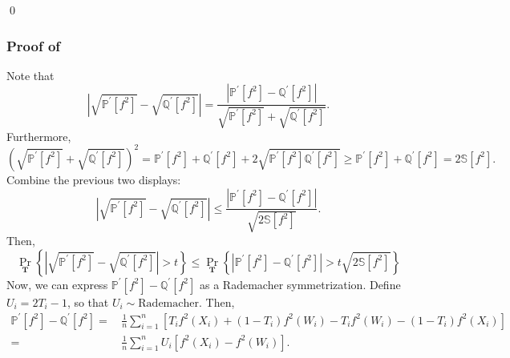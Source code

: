 \qed

\subsubsection{Proof of
\texorpdfstring{}{Lemma
\ref{lem--sqrt-ep-2nd-moment-ratio-symm-single}}}
\label{sec--prf--lem--sqrt-ep-2nd-moment-ratio-symm-single}

Note that
\begin{equation*}
  \left| \sqrt{\mathbb{P}^{\prime} \left[ f^{2} \right]} -
  \sqrt{\mathbb{Q}^{\prime} \left[ f^{2} \right]} \right| = \frac{\left|
  \mathbb{P}^{\prime} \left[ f^{2} \right] - \mathbb{Q}^{\prime} \left[ f^{2}
  \right] \right|}{\sqrt{\mathbb{P}^{\prime} \left[ f^{2} \right]} +
  \sqrt{\mathbb{Q}^{\prime} \left[ f^{2} \right]}}.
\end{equation*}
Furthermore,
\begin{equation*}
  \left( \sqrt{\mathbb{P}^{\prime} \left[ f^{2} \right]} +
  \sqrt{\mathbb{Q}^{\prime} \left[ f^{2} \right]} \right)^{2} =
  \mathbb{P}^{\prime} \left[ f^{2} \right] + \mathbb{Q}^{\prime} \left[
  f^{2} \right] + 2 \sqrt{\mathbb{P}^{\prime} \left[ f^{2} \right]
  \mathbb{Q}^{\prime} \left[ f^{2} \right]} \geq \mathbb{P}^{\prime} \left[
  f^{2} \right] + \mathbb{Q}^{\prime} \left[ f^{2} \right] = 2
  \mathbb{S} \left[ f^{2} \right].
\end{equation*}
Combine the previous two displays:
\begin{equation*}
  \left| \sqrt{\mathbb{P}^{\prime} \left[ f^{2} \right]} -
  \sqrt{\mathbb{Q}^{\prime} \left[ f^{2} \right]} \right| \leq \frac{\left|
  \mathbb{P}^{\prime} \left[ f^{2} \right] - \mathbb{Q}^{\prime} \left[ f^{2}
  \right] \right|}{\sqrt{2 \mathbb{S} \left[ f^{2} \right]}}.
\end{equation*}
Then,
\begin{equation*}
  \Pr_{\mathbf{T}} \left\{ \left| \sqrt{\mathbb{P}^{\prime} \left[ f^{2}
  \right]} - \sqrt{\mathbb{Q}^{\prime} \left[ f^{2} \right]} \right| > t
  \right\} \leq \Pr_{\mathbf{T}} \left\{ \left| \mathbb{P}^{\prime} \left[ f^{2}
  \right] - \mathbb{Q}^{\prime} \left[ f^{2} \right] \right| > t \sqrt{2
  \mathbb{S} \left[ f^{2} \right]} \right\}
\end{equation*}
Now, we can express \(\mathbb{P}^{\prime} \left[ f^{2} \right] -
\mathbb{Q}^{\prime} \left[ f^{2} \right]\) as a Rademacher symmetrization.
Define \(U_{i} = 2 T_{i} - 1\), so that \(U_{i} \sim \mathrm{Rademacher}\).
Then,
\begin{align*}
  \mathbb{P}^{\prime} \left[ f^{2} \right] - \mathbb{Q}^{\prime} \left[ f^{2}
  \right] =
  & \, \frac{1}{n} \sum_{i = 1}^{n} \left[ T_{i} f^{2} \left( X_{i} \right)
  + \left( 1 - T_{i} \right) f^{2} \left( W_{i} \right) - T_{i} f^{2} \left(
  W_{i} \right) - \left( 1 - T_{i} \right) f^{2} \left( X_{i} \right) \right] \\
  =
  & \, \frac{1}{n} \sum_{i = 1}^{n} U_{i} \left[ f^{2} \left( X_{i} \right) -
  f^{2} \left( W_{i} \right) \right].
\end{align*}
